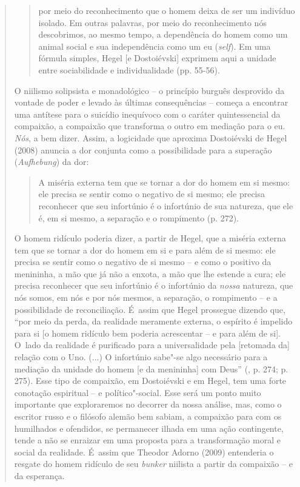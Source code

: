 {\begin{quote}
\begin{quote}
por meio do reconhecimento que o homem deixa de ser um indivíduo
isolado. Em outras palavras, por meio do reconhecimento nós descobrimos,
ao mesmo tempo, a dependência do homem como um animal social e sua
independência como um eu (\emph{self}). Em uma fórmula simples, Hegel
{[}e Dostoiévski{]} exprimem aqui a unidade entre sociabilidade e
individualidade (pp. 55-56).
\end{quote}

O niilismo solipsista e monadológico -- o princípio burguês desprovido
da vontade de poder e levado às últimas consequências -- começa a
encontrar uma antítese para o suicídio inequívoco com o caráter
quintessencial da compaixão, a compaixão que transforma o outro em
mediação para o eu. \emph{Nós}, a bem dizer. Assim, a logicidade que
aproxima Dostoiévski de Hegel (2008) anuncia a dor conjunta como a
possibilidade para a superação (\emph{Aufhebung}) da dor:

\begin{quote}
A miséria externa tem que se tornar a dor do homem em si mesmo: ele
precisa se sentir como o negativo de si mesmo; ele precisa reconhecer
que seu infortúnio é o infortúnio de sua natureza, que ele é, em si
mesmo, a separação e o rompimento (p. 272).
\end{quote}

O homem ridículo poderia dizer, a partir de Hegel, que a miséria externa
tem que se tornar a dor do homem em si e para além de si mesmo: ele
precisa se sentir como o negativo de si mesmo -- e como o positivo da
menininha, a mão que já não a enxota, a mão que lhe estende a cura; ele
precisa reconhecer que seu infortúnio é o infortúnio da \emph{nossa}
natureza, que nós somos, em nós e por nós mesmos, a separação, o
rompimento -- e a possibilidade de reconciliação. É~assim que Hegel
prossegue dizendo que, ``por meio da perda, da realidade meramente
externa, o espírito é impelido para si {[}o homem ridículo bem poderia
acrescentar -- e para além de si{]}. O~lado da realidade é purificado
para a universalidade pela {[}retomada da{]} relação com o Uno. (...) O
infortúnio sabe"-se algo necessário para a mediação da unidade do homem
{[}e da menininha{]} com Deus'' (, p. 274; p. 275). Esse tipo de
compaixão, em Dostoiévski e em Hegel, tem uma forte conotação espiritual
-- e político"-social. Esse será um ponto muito importante que
exploraremos no decorrer da nossa análise, mas, como o escritor russo e
o filósofo alemão bem sabiam, a compaixão para com os humilhados e
ofendidos, se permanecer ilhada em uma ação contingente, tende a não se
enraizar em uma proposta para a transformação moral e social da
realidade. É~assim que Theodor Adorno (2009) entenderia o resgate do
homem ridículo de seu \emph{bunker} niilista a partir da compaixão -- e
da esperança.


\end{quote}}
